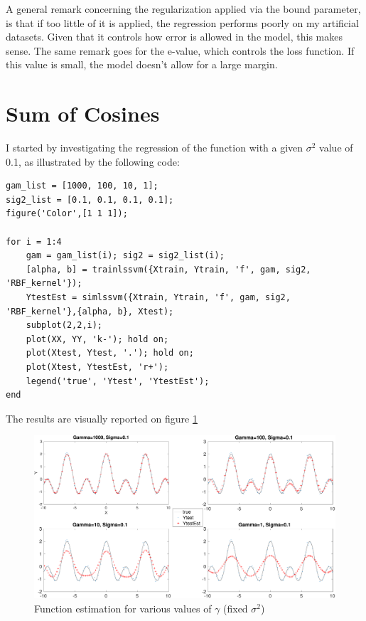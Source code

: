 \documentclass[11pt, a4paper]{article}
\begin{document}
A general remark concerning the regularization applied via the bound
parameter, is that if too little of it is applied, the regression
performs poorly on my artificial datasets. Given that it controls how
error is allowed in the model, this makes sense. The same remark goes
for the e-value, which controls the loss function. If this value is
small, the model doesn't allow for a large margin.


\section{Sum of Cosines}

I started by investigating the regression of the function with a given
$\sigma^2$ value of 0.1, as illustrated by the following code:

\begin{lstlisting}
gam_list = [1000, 100, 10, 1];
sig2_list = [0.1, 0.1, 0.1, 0.1];
figure('Color',[1 1 1]);

for i = 1:4
    gam = gam_list(i); sig2 = sig2_list(i);
    [alpha, b] = trainlssvm({Xtrain, Ytrain, 'f', gam, sig2, 'RBF_kernel'});
    YtestEst = simlssvm({Xtrain, Ytrain, 'f', gam, sig2, 'RBF_kernel'},{alpha, b}, Xtest);
    subplot(2,2,i);
    plot(XX, YY, 'k-'); hold on; 
    plot(Xtest, Ytest, '.'); hold on; 
    plot(Xtest, YtestEst, 'r+');
    legend('true', 'Ytest', 'YtestEst');
end
\end{lstlisting}

The results are visually reported on figure \ref{fig:sumcos1}

\begin{figure}[H]
    \centering
    \includegraphics[scale=.40]{sumcos1.pdf}
    \caption{Function estimation for various values of $\gamma$ (fixed
      $\sigma^2$)}
    \label{fig:sumcos1}
\end{figure}
\end{document}

